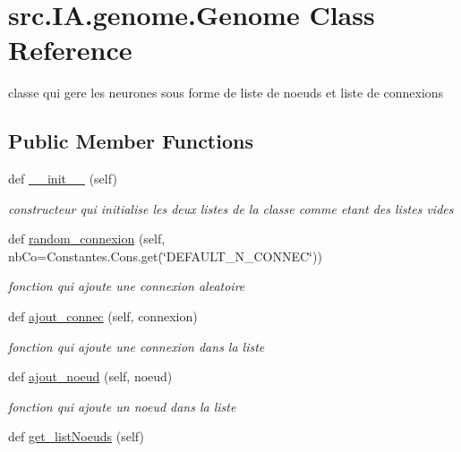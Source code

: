 \hypertarget{classsrc_1_1_i_a_1_1genome_1_1_genome}{}\section{src.\+I\+A.\+genome.\+Genome Class Reference}
\label{classsrc_1_1_i_a_1_1genome_1_1_genome}


classe qui gere les neurones sous forme de liste de noeuds et liste de connexions  


\subsection*{Public Member Functions}
\begin{DoxyCompactItemize}
\item 
def \hyperlink{classsrc_1_1_i_a_1_1genome_1_1_genome_aa2ac658a0a10371801446a2631bd4cab}{\+\_\+\+\_\+init\+\_\+\+\_\+} (self)
\begin{DoxyCompactList}\small\item\em constructeur qui initialise les deux listes de la classe comme etant des listes vides \end{DoxyCompactList}\item 
def \hyperlink{classsrc_1_1_i_a_1_1genome_1_1_genome_a361c26903fa6bc978955402580c8d1b2}{random\+\_\+connexion} (self, nb\+Co=Constantes.\+Cons.\+get(\char`\"{}D\+E\+F\+A\+U\+L\+T\+\_\+\+N\+\_\+\+C\+O\+N\+N\+EC\char`\"{}))
\begin{DoxyCompactList}\small\item\em fonction qui ajoute une connexion aleatoire \end{DoxyCompactList}\item 
def \hyperlink{classsrc_1_1_i_a_1_1genome_1_1_genome_ad69b8deb3d375fd6a7ed59d5af580e5c}{ajout\+\_\+connec} (self, connexion)
\begin{DoxyCompactList}\small\item\em fonction qui ajoute une connexion dans la liste \end{DoxyCompactList}\item 
def \hyperlink{classsrc_1_1_i_a_1_1genome_1_1_genome_a8af471d98e92b89554c1d8c529cbd9b6}{ajout\+\_\+noeud} (self, noeud)
\begin{DoxyCompactList}\small\item\em fonction qui ajoute un noeud dans la liste \end{DoxyCompactList}\item 
def \hyperlink{classsrc_1_1_i_a_1_1genome_1_1_genome_a03932bb05e9e56b789930f8462e8cbc3}{get\+\_\+list\+Noeuds} (self)

\end{DoxyCompactItemize}
